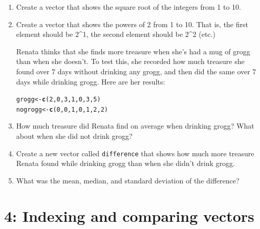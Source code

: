 \documentclass{tufte-book}\usepackage[]{graphicx}\usepackage[]{color}
\makeatletter
\newcommand{\hlnum}[1]{\textcolor[rgb]{0.686,0.059,0.569}{#1}}%
\newcommand{\hlstd}[1]{\textcolor[rgb]{0.345,0.345,0.345}{#1}}%
\newcommand{\hlkwb}[1]{\textcolor[rgb]{0.69,0.353,0.396}{#1}}%
\newcommand{\hlkwd}[1]{\textcolor[rgb]{0.737,0.353,0.396}{\textbf{#1}}}%
\newenvironment{kframe}{%
 \def\at@end@of@kframe{}%
 \ifinner\ifhmode%
  \def\at@end@of@kframe{\end{minipage}}%
  \begin{minipage}{\columnwidth}%
 \fi\fi%
 \def\FrameCommand##1{\hskip\@totalleftmargin \hskip-\fboxsep
 \colorbox{shadecolor}{##1}\hskip-\fboxsep
     \hskip-\linewidth \hskip-\@totalleftmargin \hskip\columnwidth}%
 \MakeFramed {\advance\hsize-\width
   \@totalleftmargin\z@ \linewidth\hsize
   \@setminipage}}%
 {\par\unskip\endMakeFramed%
 \at@end@of@kframe}
\newenvironment{knitrout}{}{} %
\makeatother
\begin{document}
\begin{enumerate}

\item Create a vector that shows the square root of the integers from 1 to 10.

\item Create a vector that shows the powers of 2 from 1 to 10. That is, the first element should be 2^1, the second element should be 2^2 (etc.)

Renata thinks that she finds more treasure when she's had a mug of grogg than when she doesn't. To test this, she recorded how much treasure she found over 7 days without drinking any grogg, and then did the same over 7 days while drinking grogg. Here are her results:

\begin{knitrout}
\color{fgcolor}\begin{kframe}
\begin{alltt}
\hlstd{grogg} \hlkwb{<-} \hlkwd{c}\hlstd{(}\hlnum{2}\hlstd{,} \hlnum{0}\hlstd{,} \hlnum{3}\hlstd{,} \hlnum{1}\hlstd{,} \hlnum{0}\hlstd{,} \hlnum{3}\hlstd{,} \hlnum{5}\hlstd{)}
\hlstd{nogrogg} \hlkwb{<-} \hlkwd{c}\hlstd{(}\hlnum{0}\hlstd{,} \hlnum{0}\hlstd{,} \hlnum{1}\hlstd{,} \hlnum{0}\hlstd{,} \hlnum{1}\hlstd{,} \hlnum{2}\hlstd{,} \hlnum{2}\hlstd{)}
\end{alltt}
\end{kframe}
\end{knitrout}

\item How much treasure did Renata find on average when drinking grogg? What about when she did not drink grogg?

\item Create a new vector called \texttt{difference} that shows how much more treasure Renata found while drinking grogg than when she didn't drink grogg.

\item What was the mean, median, and standard deviation of the difference?

\end{enumerate}






\chapter{4: Indexing and comparing vectors}
\label{ch:4}
\end{document}
